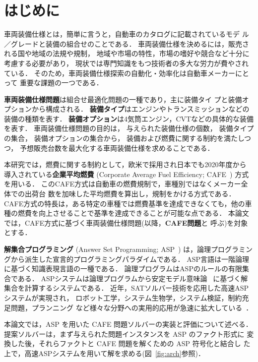 \section{はじめに}\label{sec:introduction}


車両装備仕様とは，簡単に言うと，自動車のカタログに記載されているモデ
ル／グレードと装備の組合せのことである．
車両装備仕様を決めるには，販売される国や地域の法規や規制，
地域や市場の特性，市場の嗜好や競合など十分に考慮する必要があり，
現状では専門知識をもつ技術者の多大な労力が費やされている．
そのため，車両装備仕様探索の自動化・効率化は自動車メーカーにとって
重要な課題の一つである．

\textbf{車両装備仕様問題}は組合せ最適化問題の一種であり，主に装備タイ
プと装備オプションから構成される．
\textbf{装備タイプ}はエンジンやトランスミッションなどの装備の種類を表す．
\textbf{装備オプション}は4気筒エンジン，CVTなどの具体的な装備を表す．
車両装備仕様問題の目的は，
与えられた装備仕様の個数，
装備タイプの集合，
装備オプションの集合から，
装備および燃費に関する制約を満たしつつ，
予想販売台数を最大化する車両装備仕様を求めることである．

本研究では，燃費に関する制約として，欧米で採用され日本でも2020年度から
導入されている\textbf{企業平均燃費}
(Corporate Average Fuel Efficiency; CAFE~\cite{metimlit18:cafe})
方式を用いる．
このCAFE方式は自動車の燃費規制で，車種別ではなくメーカー全体での出荷台
数を加味した平均燃費を算出し，規制をかける方式である．
CAFE方式の特長は，ある特定の車種では燃費基準を達成できなくても，他の車
種の燃費を向上させることで基準を達成できることが可能な点である．
本論文では，CAFE方式に基づく車両装備仕様問題(以降，\textbf{CAFE問題}と
呼ぶ)を対象とする．

\textbf{解集合プログラミング}
(Answer Set Programming; ASP~\cite{%
  Baral03:cambridge,%
  Gelfond88:iclp,%
  Inoue08:jssst})
は，論理プログラミングから派生した宣言的プログラミングパラダイムである．
ASP言語は一階論理に基づく知識表現言語の一種である．
論理プログラムはASPのルールの有限集合である．
ASPシステムは論理プログラムから安定モデル意味論~\cite{Gelfond88:iclp}
に基づく解集合を計算するシステムである．
近年，SATソルバー技術を応用した高速ASPシステムが実現され，
ロボット工学，システム生物学，システム検証，制約充足問題，プランニング
など様々な分野への実用的応用が急速に拡大している~\cite{Gelfond16:aim}．

本論文では，ASP を用いた CAFE 問題ソルバーの実装と評価について述べる．
提案ソルバーは，まず与えられた問題インスタンスを ASP のファクト形式に
変換した後，それらファクトと CAFE 問題を解くための ASP 符号化と結合し
た上で，高速ASPシステムを用いて解を求める(図~\ref{fig:arch}参照)．

